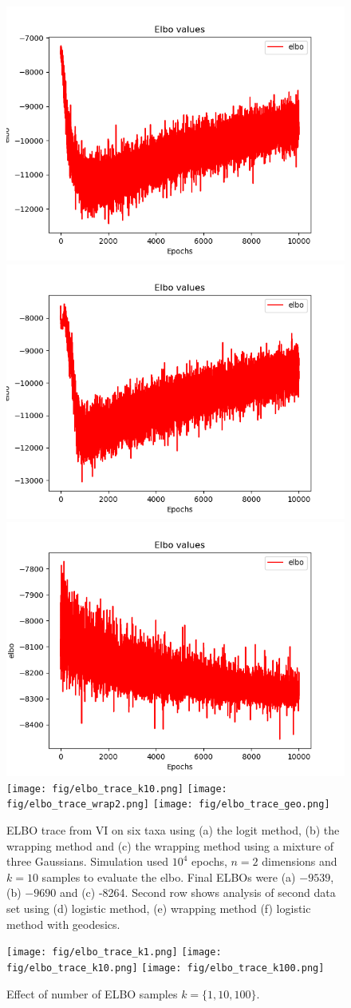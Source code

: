 \documentclass[11pt]{article}
\begin{document}
\begin{figure}[htbp]
\begin{center}
\includegraphics[width=.333\linewidth]{fig/elbo_trace_logit.png}%
\includegraphics[width=.333\linewidth]{fig/elbo_trace_wrap.png}%
\includegraphics[width=.333\linewidth]{fig/elbo_trace_wrap_B3.png}
\texttt{[image: fig/elbo\_trace\_k10.png]}%
\texttt{[image: fig/elbo\_trace\_wrap2.png]}%
\texttt{[image: fig/elbo\_trace\_geo.png]}
\caption{ELBO trace from VI on six taxa using (a) the logit method, (b) the wrapping method and (c) the wrapping method using a mixture of three Gaussians. Simulation used $10^{4}$ epochs, $n=2$ dimensions and $k=10$ samples to evaluate the elbo. Final ELBOs were (a) $-9539$, (b) $-9690$ and (c) -8264. Second row shows analysis of second data set using (d) logistic method, (e) wrapping method (f) logistic method with geodesics.}
\label{fig:elbo}
\end{center}
\end{figure}

\begin{figure}[htbp]
\begin{center}
\texttt{[image: fig/elbo\_trace\_k1.png]}%
\texttt{[image: fig/elbo\_trace\_k10.png]}%
\texttt{[image: fig/elbo\_trace\_k100.png]}
\caption{Effect of number of ELBO samples $k=\{1, 10, 100\}$.}
\label{fig:k_samples}
\end{center}
\end{figure}
\end{document}
